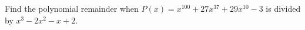 Find the polynomial remainder when $P(x)=x^{100}+27x^{37}+29x^{10}-3$ is divided by $x^3-2x^2-x+2$.
